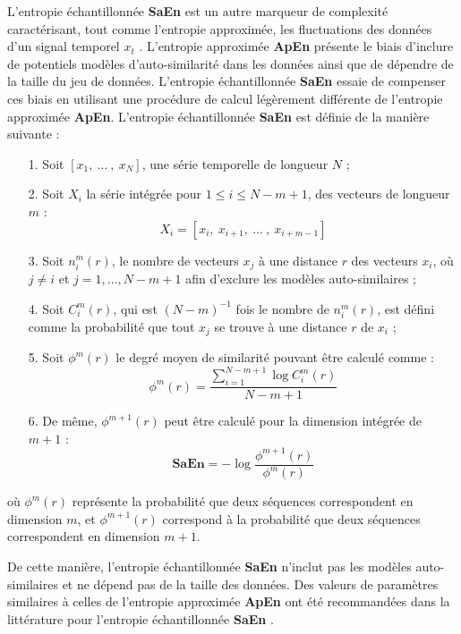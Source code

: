 L'entropie échantillonnée \textbf{SaEn} est un autre marqueur de complexité caractérisant, tout comme l'entropie approximée, les fluctuations des données d'un signal temporel $x_t$ \citep{richman2000physiological}. 
L'entropie approximée \textbf{ApEn} présente le biais d'inclure de potentiels modèles d'auto-similarité dans les données ainsi que de dépendre de la taille du jeu de données. 
L'entropie échantillonnée \textbf{SaEn} essaie de compenser ces biais en utilisant une procédure de calcul légèrement différente de l'entropie approximée \textbf{ApEn}.
L'entropie échantillonnée \textbf{SaEn} est définie de la manière suivante : \\

\begin{itemize}
\item[1.] Soit $[x_1,~\ldots~,~x_N]$, une série temporelle de longueur $N$ ; 
\item[2.] Soit  $X_i$ la série intégrée pour $1\leq i \leq N-m+1$, des vecteurs de longueur $m$ :
\begin{equation}
X_i = [x_i,~x_{i+1},~\ldots~,~x_{i+m-1}]
\end{equation}
\item[3.] Soit $n_i^m(r)$, le nombre de vecteurs $x_j$ à une distance $r$ des vecteurs $x_i$, où $j \neq i$ et $j=1,\ldots,N-m+1$ afin d'exclure les modèles auto-similaires ;
\item[4.] Soit $C_i^m(r)$, qui est $(N-m)^{-1}$ fois le nombre de $n_i^m(r)$, est défini comme la probabilité que tout $x_j$ se trouve à une distance $r$ de $x_i$ ;
\item[5.] Soit $\phi^m(r)$ le degré moyen de similarité pouvant être calculé comme :
\begin{equation}
\phi^m(r) = \frac{\sum_{i=1}^{N-m+1} \log C_i^m(r)}{N-m+1}
\end{equation}
\item[6.] De même, $\phi^{m+1}(r)$ peut être calculé pour la dimension intégrée de $m+1$ : 
\begin{equation}
\textbf{SaEn} = - \log \frac{\phi^{m+1}(r)}{\phi^m(r)}
\end{equation}
\end{itemize}
où $\phi^m(r)$ représente la probabilité que deux séquences correspondent en dimension $m$, et $\phi^{m+1}(r)$ correspond à la probabilité que deux séquences correspondent en dimension $m+1$. 

De cette manière, l'entropie échantillonnée \textbf{SaEn} n'inclut pas les modèles auto-similaires et ne dépend pas de la taille des données. 
Des valeurs de paramètres similaires à celles de l'entropie approximée \textbf{ApEn} ont été recommandées dans la littérature pour l'entropie échantillonnée \textbf{SaEn} \citep{wang2018real, zhang2015performance, zurek2018bootstrapping}. 

